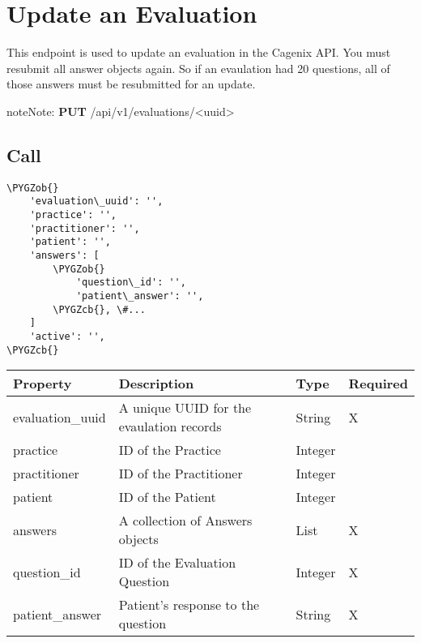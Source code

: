 \documentclass[letterpaper,10pt,english]{sphinxmanual}
\def\PYGZob{\char`\{}
\def\PYGZcb{\char`\}}
\begin{document}
\section{Update an Evaluation}
\label{dev-api-evaluations:update-an-evaluation}
This endpoint is used to update an evaluation in the Cagenix API. You must
resubmit all answer objects again.  So if an evaulation had 20 questions, all of
those answers must be resubmitted for an update.

\begin{notice}{note}{Note:}
\textbf{PUT} /api/v1/evaluations/\textless{}uuid\textgreater{}
\end{notice}


\subsection{Call}
\label{dev-api-evaluations:id2}
\begin{Verbatim}[commandchars=\\\{\}]
\PYGZob{}
    'evaluation\_uuid': '',
    'practice': '',
    'practitioner': '',
    'patient': '',
    'answers': [
        \PYGZob{}
            'question\_id': '',
            'patient\_answer': '',
        \PYGZcb{}, \#...
    ]
    'active': '',
\PYGZcb{}
\end{Verbatim}

\begin{tabulary}{\linewidth}{|L|L|L|L|}
\hline
\textsf{\relax 
Property
} & \textsf{\relax 
Description
} & \textsf{\relax 
Type
} & \textsf{\relax 
Required
}\\
\hline
evaluation\_uuid
 & 
A unique UUID for the evaulation
records
 & 
String
 & 
X
\\

practice
 & 
ID of the Practice
 & 
Integer
 & \\

practitioner
 & 
ID of the Practitioner
 & 
Integer
 & \\

patient
 & 
ID of the Patient
 & 
Integer
 & \\

answers
 & 
A collection of Answers objects
 & 
List
 & 
X
\\

question\_id
 & 
ID of the Evaluation Question
 & 
Integer
 & 
X
\\

patient\_answer
 & 
Patient's response to the question
 & 
String
 & 
X
\\
\hline\end{tabulary}
\end{document}
